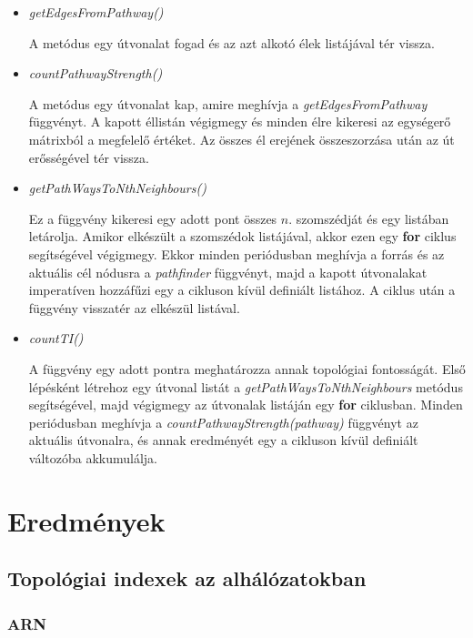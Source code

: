 \documentclass[a4paper,12pt]{article}
\begin{document}
\begin{itemize}
			\item \textit{getEdgesFromPathway()}
			
			A metódus egy útvonalat fogad és az azt alkotó élek listájával tér vissza. 
			
			\pagebreak
			
			\item \textit{countPathwayStrength()}
			
			A metódus egy útvonalat kap, amire meghívja a \textit{getEdgesFromPathway} függvényt. A kapott éllistán végigmegy és minden élre kikeresi az egységerő mátrixból a megfelelő értéket. Az összes él erejének összeszorzása után az út erősségével tér vissza.
			
			\item \textit{getPathWaysToNthNeighbours()}
			
			Ez a függvény kikeresi egy adott pont összes $n$. szomszédját és egy listában letárolja. Amikor elkészült a szomszédok listájával, akkor ezen egy \textbf{for} ciklus segítségével végigmegy. Ekkor minden periódusban meghívja a forrás és az aktuális cél nódusra a \textit{pathfinder} függvényt, majd a kapott útvonalakat imperatíven hozzáfűzi egy a cikluson kívül definiált listához. A ciklus után a függvény visszatér az elkészül listával.
			
			\item \textit{countTI()}
			
			A függvény egy adott pontra meghatározza annak topológiai fontosságát. Első lépésként létrehoz egy útvonal listát a \textit{getPathWaysToNthNeighbours} metódus segítségével, majd végigmegy az útvonalak listáján egy \textbf{for} ciklusban. Minden periódusban meghívja a \textit{countPathwayStrength(pathway)} függvényt az aktuális útvonalra, és annak eredményét egy a cikluson kívül definiált változóba akkumulálja.
			
		\end{itemize}
		\pagebreak


\section{Eredmények}
	
	
	\subsection{Topológiai indexek az alhálózatokban}
		\subsubsection{ARN}
	
\end{document}
